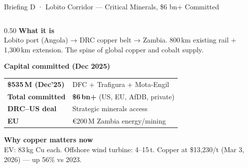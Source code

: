 \documentclass[aspectratio=169,10pt]{beamer}
\newcommand{\er}{{\textcolor{navy}{\rule{16pt}{2.5pt}}}\enspace}
\begin{document}
\begin{frame}{Briefing D · Lobito Corridor — Critical Minerals, \$6 bn+ Committed}
\begin{columns}[T,totalwidth=\textwidth]

\begin{column}{0.50\textwidth}
{\scriptsize\bfseries\color{navy}\er What it is}\\[2pt]
{\footnotesize\color{coal}
  Lobito port (Angola) → DRC copper belt → Zambia.
  800\,km existing rail + 1,300\,km extension.
  The spine of global copper and cobalt supply.}

\vspace{3pt}
{\scriptsize\bfseries\color{navy}\er Capital committed (Dec 2025)}\\[2pt]
\renewcommand{\arraystretch}{1.18}
\setlength{\tabcolsep}{3pt}
{\footnotesize
\begin{tabular}{>{\bfseries\color{navy}}p{2.0cm}>{\footnotesize}p{3.0cm}}
  \rowcolor{ice} \$535\,M (Dec'25) & DFC + Trafigura + Mota-Engil \\
  Total committed & \textbf{\$6\,bn+} (US, EU, AfDB, private) \\
  \rowcolor{ice} DRC–US deal & Strategic minerals access \\
  EU & €200\,M Zambia energy/mining \\
\end{tabular}}

\vspace{3pt}
{\scriptsize\bfseries\color{navy}\er Why copper matters now}\\[2pt]
{\footnotesize\color{coal}
  EV: 83\,kg Cu each. Offshore wind turbine: 4–15\,t.
  Copper at \$13{,}230/t (Mar 3, 2026) — up 56\% vs 2023.}
\end{column}


\end{columns}
\end{frame}
\end{document}
